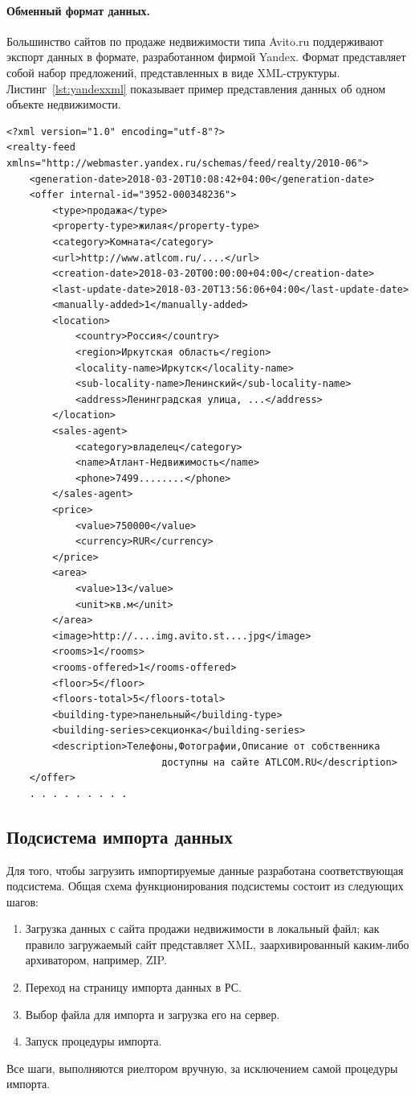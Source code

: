 \documentclass[a4paper,14pt,openany,final]{extreport} %
\def\oldcaption{} \let\oldcaption=\caption
\def\caption{\stepcounter{captionsnum}\oldcaption}
\begin{document}
{\paragraph{Обменный формат данных.}
Большинство сайтов по продаже недвижимости типа Avito.ru поддерживают экспорт данных в формате, разработанном фирмой Yandex. Формат представляет собой набор предложений, представленных в виде XML-структуры. Листинг~\ref{lst:yandexxml} показывает пример представления данных об одном объекте недвижимости.
\begin{pzlisting}
  \caption{Пример представления импортируемых данных об объекте недвижимости в формате Yandex.}
  \label{lst:yandexxml}
\begin{verbatim}
<?xml version="1.0" encoding="utf-8"?>
<realty-feed xmlns="http://webmaster.yandex.ru/schemas/feed/realty/2010-06">
	<generation-date>2018-03-20T10:08:42+04:00</generation-date>
	<offer internal-id="3952-000348236">
		<type>продажа</type>
		<property-type>жилая</property-type>
		<category>Комната</category>
		<url>http://www.atlcom.ru/....</url>
		<creation-date>2018-03-20T00:00:00+04:00</creation-date>
		<last-update-date>2018-03-20T13:56:06+04:00</last-update-date>
		<manually-added>1</manually-added>
		<location>
			<country>Россия</country>
			<region>Иркутская область</region>
			<locality-name>Иркутск</locality-name>
			<sub-locality-name>Ленинский</sub-locality-name>
			<address>Ленинградская улица, ...</address>
		</location>
		<sales-agent>
			<category>владелец</category>
			<name>Атлант-Недвижимость</name>
			<phone>7499........</phone>
		</sales-agent>
		<price>
			<value>750000</value>
			<currency>RUR</currency>
		</price>
		<area>
			<value>13</value>
			<unit>кв.м</unit>
		</area>
		<image>http://....img.avito.st....jpg</image>
		<rooms>1</rooms>
		<rooms-offered>1</rooms-offered>
		<floor>5</floor>
		<floors-total>5</floors-total>
		<building-type>панельный</building-type>
		<building-series>секционка</building-series>
		<description>Телефоны,Фотографии,Описание от собственника
                           доступны на сайте ATLCOM.RU</description>
	</offer>
	. . . . . . . . .
\end{verbatim}
\end{pzlisting}

\subsection{Подсистема импорта данных}
Для того, чтобы загрузить импортируемые данные разработана соответствующая подсистема. Общая схема функционирования подсистемы состоит из следующих шагов:
\begin{enumerate}
\item Загрузка данных с сайта продажи недвижимости в локальный файл; как правило загружаемый сайт представляет XML, заархивированный каким-либо архиватором, например, ZIP.
\item Переход на страницу импорта данных в РС.
\item Выбор файла для импорта и загрузка его на сервер.
\item Запуск процедуры импорта.
\end{enumerate}
Все шаги, выполняются риелтором вручную, за исключением самой процедуры импорта.

}
\end{document}
